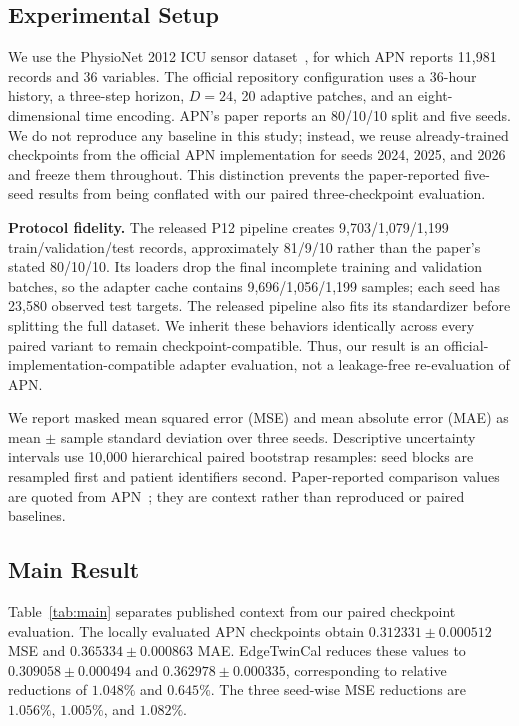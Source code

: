 \documentclass[conference]{IEEEtran}
\begin{document}
\subsection{Experimental Setup}
We use the PhysioNet 2012 ICU sensor dataset~\cite{silva2012physionet}, for which APN reports 11,981 records and 36 variables. The official repository configuration uses a 36-hour history, a three-step horizon, $D=24$, 20 adaptive patches, and an eight-dimensional time encoding. APN's paper reports an 80/10/10 split and five seeds. We do not reproduce any baseline in this study; instead, we reuse already-trained checkpoints from the official APN implementation for seeds 2024, 2025, and 2026 and freeze them throughout. This distinction prevents the paper-reported five-seed results from being conflated with our paired three-checkpoint evaluation.

\textbf{Protocol fidelity.} The released P12 pipeline creates 9,703/1,079/1,199 train/validation/test records, approximately 81/9/10 rather than the paper's stated 80/10/10. Its loaders drop the final incomplete training and validation batches, so the adapter cache contains 9,696/1,056/1,199 samples; each seed has 23,580 observed test targets. The released pipeline also fits its standardizer before splitting the full dataset. We inherit these behaviors identically across every paired variant to remain checkpoint-compatible. Thus, our result is an official-implementation-compatible adapter evaluation, not a leakage-free re-evaluation of APN.

We report masked mean squared error (MSE) and mean absolute error (MAE) as mean $\pm$ sample standard deviation over three seeds. Descriptive uncertainty intervals use 10,000 hierarchical paired bootstrap resamples: seed blocks are resampled first and patient identifiers second. Paper-reported comparison values are quoted from APN~\cite{liu2026apn}; they are context rather than reproduced or paired baselines.

\subsection{Main Result}
Table~\ref{tab:main} separates published context from our paired checkpoint evaluation. The locally evaluated APN checkpoints obtain $0.312331\pm0.000512$ MSE and $0.365334\pm0.000863$ MAE. EdgeTwinCal reduces these values to $0.309058\pm0.000494$ and $0.362978\pm0.000335$, corresponding to relative reductions of $1.048\%$ and $0.645\%$. The three seed-wise MSE reductions are $1.056\%$, $1.005\%$, and $1.082\%$.
\end{document}
